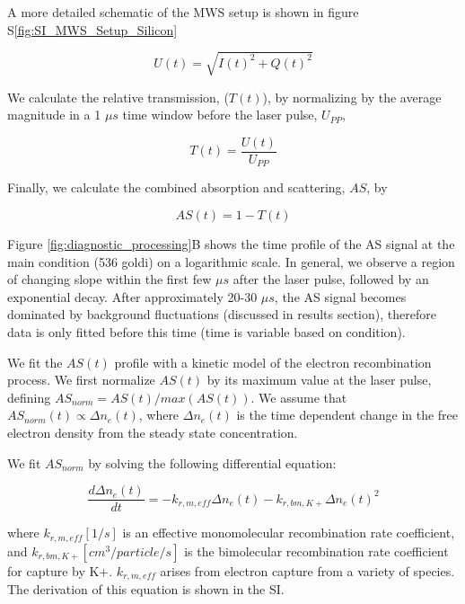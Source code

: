 A more detailed schematic of the MWS setup is shown in figure S\ref*{fig:SI_MWS_Setup_Silicon}

\begin{equation}
    U(t) = \sqrt{I(t)^2 + Q(t)^2}
\end{equation}

We calculate the relative transmission, ($T(t)$), by normalizing by the average magnitude in a 1 $\mu s$ time window before the laser pulse, $U_{PP}$,   

\begin{equation}
    T(t) = \frac{U(t)}{U_{PP}}
\end{equation}

Finally, we calculate the combined absorption and scattering, $AS$, by

\begin{equation}
    AS(t) = 1 - T(t)
\end{equation}

Figure \ref{fig:diagnostic_processing}B shows the time profile of the AS signal at the main condition (536 goldi) on a logarithmic scale. In general, we observe a region of changing slope within the first few $\mu s$ after the laser pulse, followed by an exponential decay. After approximately 20-30 $\mu s$, the AS signal becomes dominated by background fluctuations (discussed in results section), therefore data is only fitted before this time (time is variable based on condition). 

We fit the $AS (t)$ profile with a kinetic model of the electron recombination process. We first normalize $AS (t)$ by its maximum value at the laser pulse, defining $AS_{norm} = AS(t)/max(AS(t))$. We assume that $AS_{norm}(t) \propto \Delta n_e (t)$, where $\Delta n_e (t)$ is the time dependent change in the free electron density from the steady state concentration. 

We fit $AS_{norm}$ by solving the following differential equation: 

\begin{equation}
    \label{eq:fit_eq}
    \frac{d\Delta n_e (t)}{dt} = - k_{r, m, eff} \Delta n_e (t) - k_{r, bm, K+}\Delta{n_e (t)}^2
\end{equation}

where $k_{r, m, eff} [1/s]$ is an effective monomolecular recombination rate coefficient, and $k_{r, bm, K+} [cm^3/particle/s]$ is the bimolecular recombination rate coefficient for capture by K+. $k_{r, m, eff}$ arises from electron capture from a variety of species. The derivation of this equation is shown in the SI.

